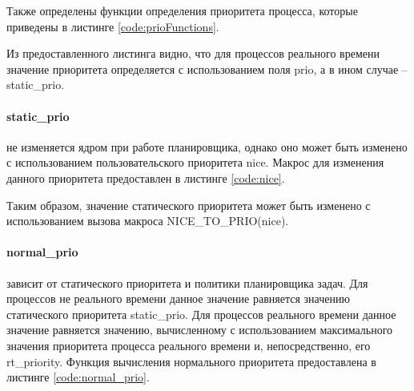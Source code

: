 Также определены функции определения приоритета процесса, которые приведены в листинге \ref{code:prioFunctions}.


Из предоставленного листинга видно, что для процессов реального времени значение приоритета определяется с использованием поля prio, а в ином случае -- static\_prio.

\paragraph*{static\_prio} не изменяется ядром при работе планировщика, однако оно может быть изменено с использованием пользовательского приоритета nice. Макрос для изменения данного приоритета предоставлен в листинге \ref{code:nice}.


Таким образом, значение статического приоритета может быть изменено с использованием вызова макроса NICE\_TO\_PRIO(nice).

\paragraph*{normal\_prio} зависит от статического приоритета и политики планировщика задач. Для процессов не реального времени данное значение равняется значению статического приоритета static\_prio. Для процессов реального времени данное значение равняется значению, вычисленному с использованием максимального значения приоритета процесса реального времени и, непосредственно, его rt\_priority. Функция вычисления нормального приоритета предоставлена в листинге \ref{code:normal_prio}.


